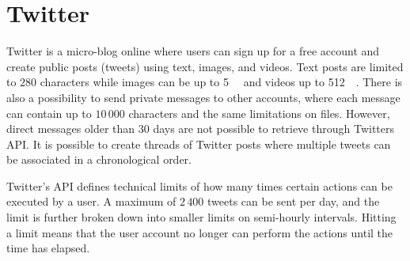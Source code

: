 \section{Twitter}
Twitter is a micro-blog online where users can sign up for a free account and create public posts (tweets) using text, images, and videos. Text posts are limited to $280$ characters while images can be up to \SI{5}{\mega\byte} and videos up to \SI{512}{\mega\byte}\cite{MediaBestPractices}. There is also a possibility to send private messages to other accounts, where each message can contain up to $10\,000$ characters and the same limitations on files. However, direct messages older than $30$ days are not possible to retrieve through Twitters API\cite{RetrievingOlder302018}. It is possible to create threads of Twitter posts where multiple tweets can be associated in a chronological order.

Twitter's API defines technical limits of how many times certain actions can be executed by a user\cite{UnderstandingTwitterLimits}. A maximum of $2\,400$ tweets can be sent per day, and the limit is further broken down into smaller limits on semi-hourly intervals. Hitting a limit means that the user account no longer can perform the actions until the time has elapsed.